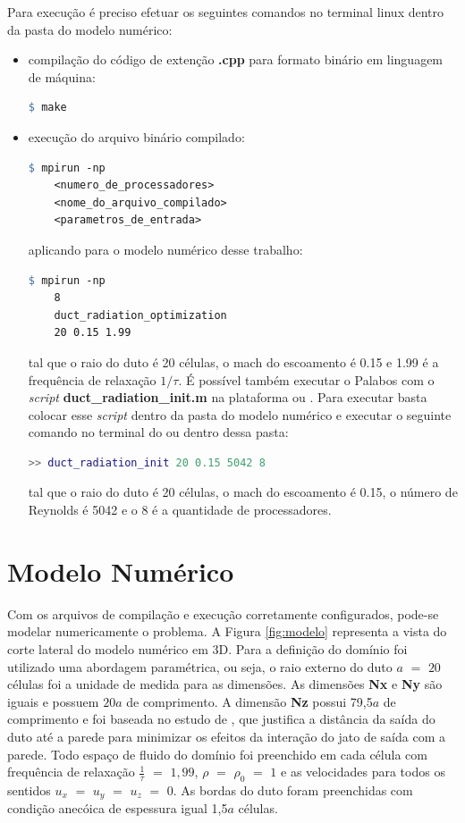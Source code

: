 Para execução é preciso efetuar os seguintes comandos no terminal linux dentro da pasta do modelo numérico:
\begin{itemize}
  \item compilação do código de extenção \textbf{.cpp} para formato binário em linguagem de máquina:
  \begin{lstlisting}[language=make, frame = single]
    $ make
  \end{lstlisting}
  \item execução do arquivo binário compilado:
  \begin{lstlisting}[language=make, frame = single]
    $ mpirun -np 
    <numero_de_processadores> 
    <nome_do_arquivo_compilado> 
    <parametros_de_entrada>
  \end{lstlisting}
  aplicando para o modelo numérico desse trabalho:
  \begin{lstlisting}[language=make, frame = single]
    $ mpirun -np 
    8
    duct_radiation_optimization
    20 0.15 1.99
  \end{lstlisting}
  tal que o raio do duto é 20 células, o mach do escoamento é 0.15 e 1.99 é a frequência de relaxação $1/\tau$. É possível também executar o Palabos com o \textit{script} \textbf{duct\_radiation\_init.m} na plataforma  ou . Para executar basta colocar esse \textit{script} dentro da pasta do modelo numérico e executar o seguinte comando no terminal do  ou  dentro dessa pasta:
  \begin{lstlisting}[language=matlab, frame = single]
    >> duct_radiation_init 20 0.15 5042 8
  \end{lstlisting}
  tal que o raio do duto é 20 células, o mach do escoamento é 0.15, o número de Reynolds é 5042 e o 8 é a quantidade de processadores.
\end{itemize}


\section{Modelo Numérico}

Com os arquivos de compilação e execução corretamente configurados, pode-se modelar numericamente o problema. A Figura \ref{fig:modelo} representa a vista do corte lateral do modelo numérico em 3D. Para a definição do domínio foi utilizado uma abordagem paramétrica, ou seja, o raio externo do duto $a$ $=$ $20$ células foi a unidade de medida para as dimensões. As dimensões \textbf{Nx} e \textbf{Ny} são iguais e possuem $20a$ de comprimento. A dimensão \textbf{Nz} possui 79,5$a$ de comprimento e foi baseada no estudo de , que justifica a distância da saída do duto até a parede para minimizar os efeitos da interação do jato de saída com a parede. Todo espaço de fluido do domínio foi preenchido em cada célula com frequência de relaxação $\frac{1}{\tau}$ $=$ $1,99$, $\rho$ $=$ $\rho_{0}$ $=$ $1$ e as velocidades para todos os sentidos $u_{x}$ $=$ $u_{y}$ $=$ $u_{z}$ $=$ $0$. As bordas do duto foram preenchidas com condição anecóica de espessura igual 1,5$a$ células.      


